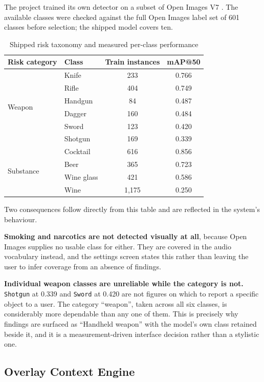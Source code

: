 \documentclass[
12pt,
a4paper,
oneside
]{report}
\begin{document}
The project trained its own detector on a subset of Open Images V7
\cite{Kuznetsova2020}. The available classes were checked against the full Open
Images label set of 601 classes before selection; the shipped model covers ten.

\begin{table}[H]
\centering
\begin{tabular}{|p{3.2cm}|p{3.4cm}|c|c|}
\hline
\textbf{Risk category} & \textbf{Class} & \textbf{Train instances} &
\textbf{mAP@50} \\
\hline
\multirow{6}{*}{Weapon}
 & Knife    & 233  & 0.766 \\
 & Rifle    & 404  & 0.749 \\
 & Handgun  & 84   & 0.487 \\
 & Dagger   & 160  & 0.484 \\
 & Sword    & 123  & 0.420 \\
 & Shotgun  & 169  & 0.339 \\
\hline
\multirow{4}{*}{Substance}
 & Cocktail   & 616  & 0.856 \\
 & Beer       & 365  & 0.723 \\
 & Wine glass & 421  & 0.586 \\
 & Wine       & 1{,}175 & 0.250 \\
\hline
\end{tabular}
\caption{Shipped risk taxonomy and measured per-class performance}
\end{table}

Two consequences follow directly from this table and are reflected in the
system's behaviour.

\textbf{Smoking and narcotics are not detected visually at all}, because Open
Images supplies no usable class for either. They are covered in the audio
vocabulary instead, and the settings screen states this rather than leaving the
user to infer coverage from an absence of findings.

\textbf{Individual weapon classes are unreliable while the category is not.}
\texttt{Shotgun} at 0.339 and \texttt{Sword} at 0.420 are not figures on which
to report a specific object to a user. The category ``weapon'', taken across all
six classes, is considerably more dependable than any one of them. This is
precisely why findings are surfaced as ``Handheld weapon'' with the model's own
class retained beside it, and it is a measurement-driven interface decision
rather than a stylistic one.

\subsection{Overlay Context Engine}
\label{sec:overlay}
\end{document}
